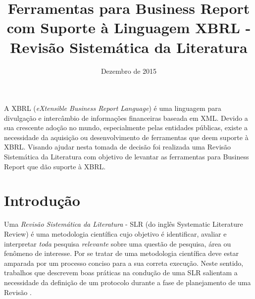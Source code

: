 \documentclass[12pt]{article}
\title{Ferramentas para Business Report \\
com Suporte à Linguagem XBRL - \\
Revisão Sistemática da Literatura}
\date{Dezembro de 2015}
\begin{document}
\maketitle


\begin{resumo}
 A XBRL (\textit{eXtensible Business Report Language})
é uma linguagem para divulgação e intercâmbio de informações financeiras
baseada em XML. Devido a sua crescente adoção no mundo, especialmente pelas
entidades públicas, existe a necessidade da aquisição ou desenvolvimento de
ferramentas que deem suporte à XBRL. Visando ajudar nesta tomada de decisão foi
realizada uma Revisão Sistemática da Literatura com objetivo de levantar as
ferramentas para Business Report que dão suporte à XBRL.
\end{resumo}


\section{Introdução}
\label{sec:contexto}

Uma \textit{Revisão Sistemática da Literatura} - SLR (do inglês Systematic Literature Review) é uma
metodologia científica cujo objetivo é identificar, avaliar e interpretar
\textit{toda} pesquisa \textit{relevante} sobre uma questão de
pesquisa, área ou fenômeno de
interesse\cite{keele2007guidelines,wohlin2012experimentation}. Por se tratar de uma metodologia científica deve estar amparada por um processo conciso para a sua correta execução. Neste sentido, trabalhos que descrevem boas práticas na condução de uma SLR salientam a necessidade da definição de um protocolo durante a fase de planejamento de uma Revisão \cite{keele2007guidelines, biolchini2005systematic}.
\end{document}
